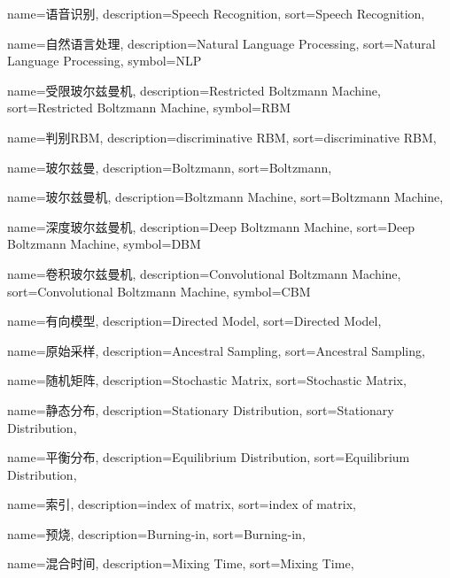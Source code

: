 {
  name=语音识别,
  description={Speech Recognition},
  sort={Speech Recognition},
}

{
  name=自然语言处理,
  description={Natural Language Processing},
  sort={Natural Language Processing},
  symbol={NLP}
}

{
  name=受限玻尔兹曼机,
  description={Restricted Boltzmann Machine},
  sort={Restricted Boltzmann Machine},
  symbol={RBM}
}

{
  name=判别RBM,
  description={discriminative RBM},
  sort={discriminative RBM},
}

{
  name=玻尔兹曼,
  description={Boltzmann},
  sort={Boltzmann},
}

{
  name=玻尔兹曼机,
  description={Boltzmann Machine},
  sort={Boltzmann Machine},
}

{
  name=深度玻尔兹曼机,
  description={Deep Boltzmann Machine},
  sort={Deep Boltzmann Machine},
  symbol={DBM}
}

{
  name=卷积玻尔兹曼机,
  description={Convolutional Boltzmann Machine},
  sort={Convolutional Boltzmann Machine},
  symbol={CBM}
}

{
  name=有向模型,
  description={Directed Model},
  sort={Directed Model},
}

{
  name=原始采样,
  description={Ancestral Sampling},
  sort={Ancestral Sampling},
}

{
  name=随机矩阵,
  description={Stochastic Matrix},
  sort={Stochastic Matrix},
}

{
  name=静态分布,
  description={Stationary Distribution},
  sort={Stationary Distribution},
}

{
  name=平衡分布,
  description={Equilibrium Distribution},
  sort={Equilibrium Distribution},
}

{
  name=索引,
  description={index of matrix},
  sort={index of matrix},
}

{
  name=预烧,
  description={Burning-in},
  sort={Burning-in},
}

{
  name=混合时间,
  description={Mixing Time},
  sort={Mixing Time},
}


